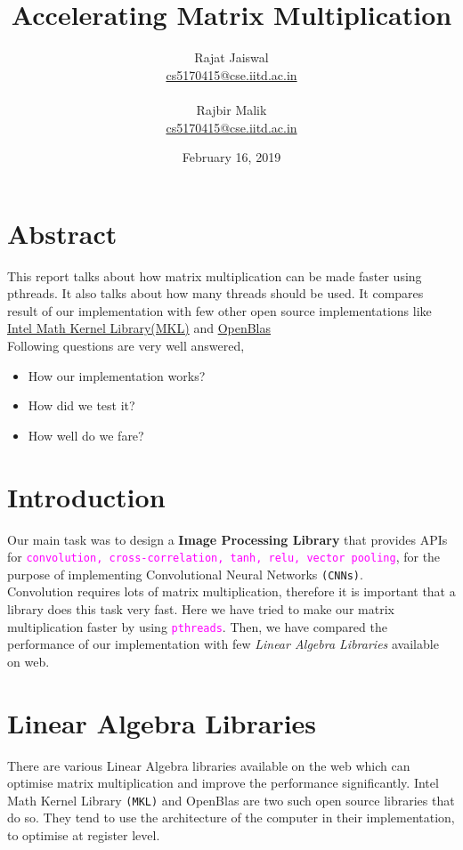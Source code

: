 \documentclass{article}
\title{Accelerating Matrix Multiplication}
\author{
        Rajat Jaiswal \\
        \href{mailto:cs5170415@cse.iitd.ac.in}{ cs5170415@cse.iitd.ac.in} \\
        \\
        Rajbir Malik \\
        \href{mailto:cs5170415@cse.iitd.ac.in}{ cs5170415@cse.iitd.ac.in} \\
    }
\date{February 16, 2019}
\begin{document}
    
    \maketitle
    
    \section*{Abstract}
    {\linespread{5}
        This report talks about how matrix multiplication can be made faster using pthreads. It also talks about how many threads should be used. It compares result of our implementation with few other open source implementations like
        \href{https://en.wikipedia.org/wiki/Math_Kernel_Library}{Intel Math Kernel Library(MKL)} and \href{https://www.openblas.net/}{OpenBlas} \\[10pt]
        Following questions are very well answered,
        \begin{itemize}
            \item How our implementation works?
            \item How did we test it?
            \item How well do we fare?
        \end{itemize}
        
    }
    
    \pagebreak  
    \section*{Introduction}
        Our main task was to design a \textbf{Image Processing Library} that provides APIs for \textcolor{magenta}{\texttt{convolution, cross-correlation, tanh, relu, vector pooling}}, for the purpose of implementing Convolutional Neural Networks \texttt{(CNNs)}. \\[5pt]
        Convolution requires lots of matrix multiplication, therefore it is important that a library does this task very fast. Here we have tried to make our matrix multiplication faster by using \textcolor{magenta}{\texttt{pthreads}}. Then, we have compared the performance of our implementation with few \emph{Linear Algebra Libraries} available on web.

    \section*{Linear Algebra Libraries}
        There are various Linear Algebra libraries available on the web which can optimise matrix multiplication and improve the performance significantly. Intel Math Kernel Library \texttt{(MKL)} and OpenBlas are two such open source libraries that do so. They tend to use the architecture of the computer in their implementation, to optimise at register level.
        
\end{document}
